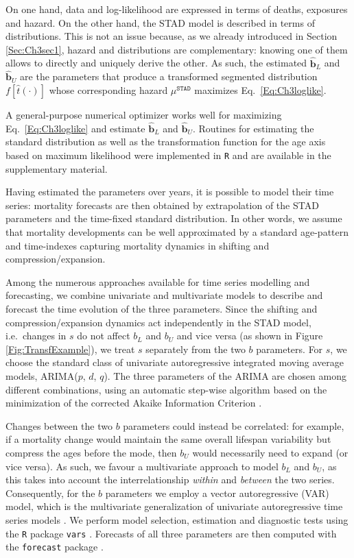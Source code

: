 \documentclass[Thesis]{subfiles}
\begin{document}
On one hand, data and log-likelihood are expressed in
terms of deaths, exposures and hazard. On the other hand, the STAD model is
described in terms of distributions. This is not an issue because, as we already introduced in Section \ref{Sec:Ch3sec1}, hazard and distributions are complementary: knowing one of them allows to directly and uniquely derive the other. As such, the estimated $\hat{\bm{b}}_{L}$ and $\hat{\bm{b}}_{U}$ are the parameters that produce a transformed segmented distribution $f\left[\hat{t}(\cdot)\right]$ whose corresponding hazard $\mu^{\texttt{STAD}}$ maximizes Eq.~\eqref{Eq:Ch3loglike}.  

A general-purpose numerical optimizer works well for maximizing Eq.~\eqref{Eq:Ch3loglike} and estimate $\hat{\bm{b}}_{L}$ and $\hat{\bm{b}}_{U}$. Routines for estimating the standard distribution as well as the
transformation function for the age axis based on maximum likelihood
were implemented in \texttt{R} \citep{Rcite} and are available in the supplementary material.

Having estimated the parameters over years, it is
possible to model their time series: mortality forecasts are then
obtained by extrapolation of the STAD parameters and the time-fixed
standard distribution. In other words, we assume that mortality developments can
be well approximated by a standard age-pattern and time-indexes
capturing mortality dynamics in shifting and compression/expansion. 

Among the numerous approaches available for time series modelling and
forecasting, we combine univariate and multivariate models to describe and forecast the time evolution of the three parameters. Since the shifting and compression/expansion dynamics act independently in the STAD model, i.e.~changes in $s$ do not affect $b_{L}$ and $b_{U}$ and vice versa (as shown in Figure \ref{Fig:TransfExample}), we treat $s$ separately from the two $b$ parameters. For $s$, we choose the standard class of univariate autoregressive integrated moving average models, ARIMA($p$, $d$, $q$). The three parameters of the ARIMA are chosen among different combinations, using an automatic step-wise algorithm based on the minimization of the corrected Akaike Information Criterion
\cite[the package default, see][]{hyndman2008automatic}.

Changes between the two $b$ parameters could instead be correlated: for example, if a mortality change would maintain the same overall lifespan variability but compress the ages before the mode, then $b_{U}$ would necessarily need to expand (or vice versa). As such, we favour a multivariate approach to model $b_{L}$ and $b_{U}$, as this takes into account the interrelationship \textit{within} and \textit{between} the two series. Consequently, for the $b$ parameters we employ a vector autoregressive (VAR) model, which is the multivariate generalization of univariate autoregressive time series models \citep{hamilton1994time}. We perform model selection, estimation and diagnostic tests using the \texttt{R} package \texttt{vars} \citep{pfaff2008analysis,pfaff2008var}. Forecasts of all three parameters are then computed with the \texttt{forecast} package \citep{hyndman2018forecastR}.
\end{document}
